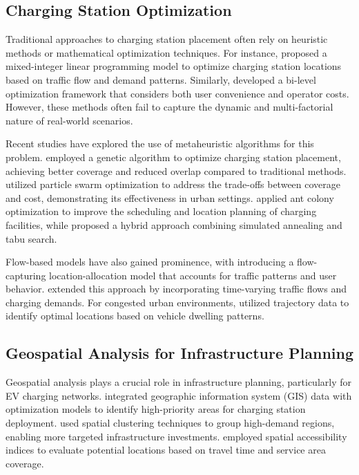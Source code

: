 \documentclass[journal]{IEEEtran}
\begin{document}
\subsection{Charging Station Optimization}
Traditional approaches to charging station placement often rely on heuristic methods or mathematical optimization techniques. For instance, \cite{kim2017optimal} proposed a mixed-integer linear programming model to optimize charging station locations based on traffic flow and demand patterns. Similarly, \cite{he2018optimal} developed a bi-level optimization framework that considers both user convenience and operator costs. However, these methods often fail to capture the dynamic and multi-factorial nature of real-world scenarios.

Recent studies have explored the use of metaheuristic algorithms for this problem. \cite{wang2019genetic} employed a genetic algorithm to optimize charging station placement, achieving better coverage and reduced overlap compared to traditional methods. \cite{zhang2020particle} utilized particle swarm optimization to address the trade-offs between coverage and cost, demonstrating its effectiveness in urban settings. \cite{li2018ant} applied ant colony optimization to improve the scheduling and location planning of charging facilities, while \cite{chen2020hybrid} proposed a hybrid approach combining simulated annealing and tabu search.

Flow-based models have also gained prominence, with \cite{tu2016planning} introducing a flow-capturing location-allocation model that accounts for traffic patterns and user behavior. \cite{zhang2017optimal} extended this approach by incorporating time-varying traffic flows and charging demands. For congested urban environments, \cite{yang2017data} utilized trajectory data to identify optimal locations based on vehicle dwelling patterns.

\subsection{Geospatial Analysis for Infrastructure Planning}
Geospatial analysis plays a crucial role in infrastructure planning, particularly for EV charging networks. \cite{li2019geospatial} integrated geographic information system (GIS) data with optimization models to identify high-priority areas for charging station deployment. \cite{chen2020spatial} used spatial clustering techniques to group high-demand regions, enabling more targeted infrastructure investments. \cite{wu2020gis} employed spatial accessibility indices to evaluate potential locations based on travel time and service area coverage.
\end{document}
